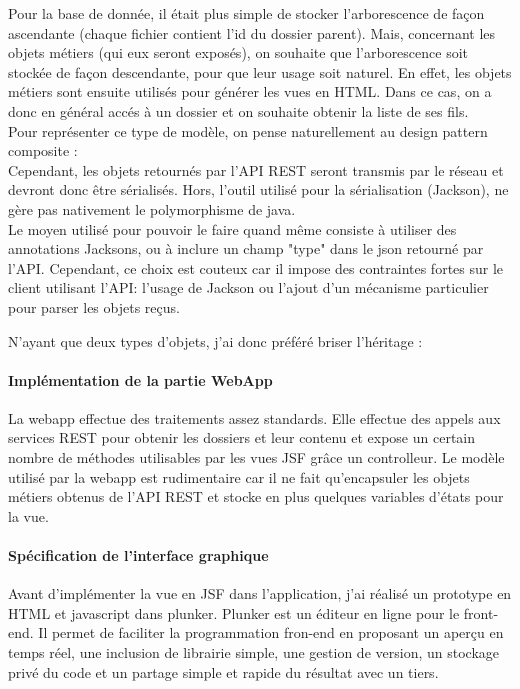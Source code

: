 Pour la base de donnée, il était plus simple de stocker l'arborescence de façon ascendante (chaque fichier contient l'id du dossier parent). Mais, concernant les objets métiers (qui eux seront exposés), on souhaite que l'arborescence soit stockée de façon descendante, pour que leur usage soit naturel.
En effet, les objets métiers sont ensuite utilisés pour générer les vues en HTML. Dans ce cas, on a donc en général accés à un dossier et on souhaite obtenir la liste de ses fils. \\

Pour représenter ce type de modèle, on pense naturellement au design pattern composite : \\

Cependant, les objets retournés par l'API REST seront transmis par le réseau et devront donc être sérialisés. Hors, l'outil utilisé pour la sérialisation (Jackson), ne gère pas nativement le polymorphisme de java. \\
Le moyen utilisé pour pouvoir le faire quand même consiste à utiliser des annotations Jacksons, ou à inclure un champ "type" dans le json retourné par l'API. Cependant, ce choix est couteux car il impose des contraintes fortes sur le client utilisant l'API: l'usage de Jackson ou l'ajout d'un mécanisme particulier pour parser les objets reçus.

N'ayant que deux types d'objets, j'ai donc préféré briser l'héritage :


\paragraph*{Implémentation de la partie WebApp}
La webapp effectue des traitements assez standards. Elle effectue des appels aux services REST pour obtenir les dossiers et leur contenu et expose un certain nombre de méthodes utilisables par les vues JSF grâce un controlleur.
Le modèle utilisé par la webapp est rudimentaire car il ne fait qu'encapsuler les objets métiers obtenus de l'API REST et stocke en plus quelques variables d'états pour la vue.

\paragraph*{Spécification de l'interface graphique}
Avant d'implémenter la vue en JSF dans l'application, j'ai réalisé un prototype en HTML et javascript dans plunker.
Plunker est un éditeur en ligne pour le front-end. Il permet de faciliter la programmation fron-end en proposant un aperçu en temps réel, une inclusion de librairie simple, une gestion de version, un stockage privé du code et un partage simple et rapide du résultat avec un tiers.


